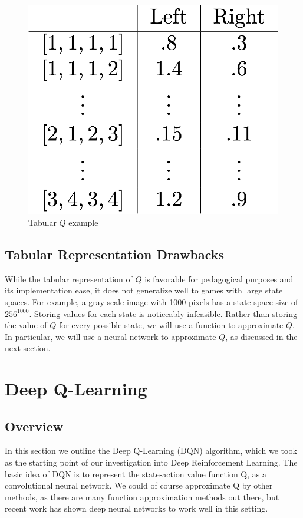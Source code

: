 \documentclass[12pt,letterpaper]{article}
\begin{document}
\begin{figure}[h!]
\centering\includegraphics[scale=0.25,clip]{cp_state_lookup_q.png}
 \caption{Tabular $Q$ example}
\label{fig:tab_q_ex}
\end{figure}

\subsection*{Tabular Representation Drawbacks}
While the tabular representation of $Q$ is favorable for pedagogical purposes and 
its implementation ease, it does not generalize well to games with large state 
spaces. For example, a gray-scale image with 1000 pixels has a state space size 
of $256^{1000}$. Storing values for each state is noticeably infeasible. Rather 
than storing the value of $Q$ for every possible state, we will use a function
to approximate $Q$. In particular, we will use a neural network to approximate
$Q$, as discussed in the next section.

\section{Deep Q-Learning}
\subsection{Overview}
In this section we outline the Deep Q-Learning (DQN) algorithm, which we took as the starting point 
of our investigation into Deep Reinforcement Learning. The basic idea of DQN is to represent the 
state-action value function Q, as a convolutional neural network. We could of course approximate 
Q by other methods, as there are many function approximation methods out there, but recent work 
has shown deep neural networks to work well in this setting. \\
\end{document}
